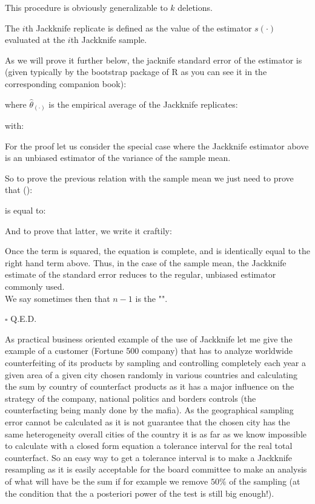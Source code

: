 	This procedure is obviously generalizable to $k$ deletions.

	The $i$th Jackknife replicate is defined as the value of the estimator $s(\cdot)$ evaluated at the $i$th Jackknife sample.
	
	As we will prove it further below, the jacknife standard error of the estimator is (given typically by the bootstrap package of R as you can see it in the corresponding companion book):
	
	where $\hat{\theta}_{(\cdot)}$ is the empirical average of the Jackknife replicates:
	
	with:
	
	For the proof let us consider the special case where the Jackknife estimator above is an unbiased estimator of the variance of the sample mean.
	\begin{dem}
	So to prove the previous relation with the sample mean we just need to prove that ():
	
	is equal to:
	
	And to prove that latter, we write it craftily:
   
   Once the term is squared, the equation is complete, and is identically equal to the right hand term above. Thus, in the case of the sample mean, the Jackknife estimate of the standard error reduces to the regular, unbiased estimator commonly used.\\
   
   	We say sometimes then that $n-1$ is the "".
	\begin{flushright}
		$\square$  Q.E.D.
	\end{flushright}
	\end{dem}
	As practical business oriented example of the use of Jackknife let me give the example of a customer (Fortune 500 company) that has to analyze worldwide counterfeiting of its products by sampling and controlling completely each year a given area of a given city chosen randomly in various countries and calculating the sum by country of counterfact products as it has a major influence on the strategy of the company, national politics and borders controls (the counterfacting being manly done by the mafia). As the geographical sampling error cannot be calculated as it is not guarantee that the chosen city has the same heterogeneity overall cities of the country it is as far as we know impossible to calculate with a closed form equation a tolerance interval for the real total counterfact. So an easy way to get a tolerance interval is to make a Jackknife resampling as it is easily acceptable for the board committee to make an analysis of what will have be the sum if for example we remove $50\%$ of the sampling (at the condition that the a posteriori power of the test is still big enough!).
	
